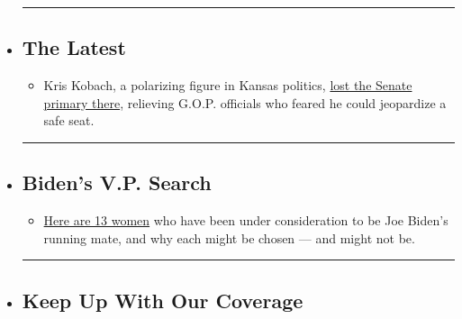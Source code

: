 \begin{itemize}
\item
  \begin{center}\rule{0.5\linewidth}{\linethickness}\end{center}

  \hypertarget{the-latest}{%
  \subsection{The Latest}\label{the-latest}}

  \begin{itemize}
  \tightlist
  \item
    Kris Kobach, a polarizing figure in Kansas politics,
    \href{https://www.nytimes.com/2020/08/04/us/politics/kobach-tlaib.html?action=click\&pgtype=Article\&state=default\&region=BELOW_MAIN_CONTENT\&context=storylines_guide}{lost
    the Senate primary there}, relieving G.O.P. officials who feared he
    could jeopardize a safe seat.
  \end{itemize}
\item
  \begin{center}\rule{0.5\linewidth}{\linethickness}\end{center}

  \hypertarget{bidens-vp-search}{%
  \subsection{Biden's V.P. Search}\label{bidens-vp-search}}

  \begin{itemize}
  \tightlist
  \item
    \href{https://www.nytimes.com/article/biden-vice-president-2020.html?action=click\&pgtype=Article\&state=default\&region=BELOW_MAIN_CONTENT\&context=storylines_guide}{Here
    are 13 women} who have been under consideration to be Joe Biden's
    running mate, and why each might be chosen --- and might not be.
  \end{itemize}
\item
  \begin{center}\rule{0.5\linewidth}{\linethickness}\end{center}

  \hypertarget{keep-up-with-our-coverage}{%
  \subsection{Keep Up With Our
  Coverage}\label{keep-up-with-our-coverage}}


\end{itemize}
